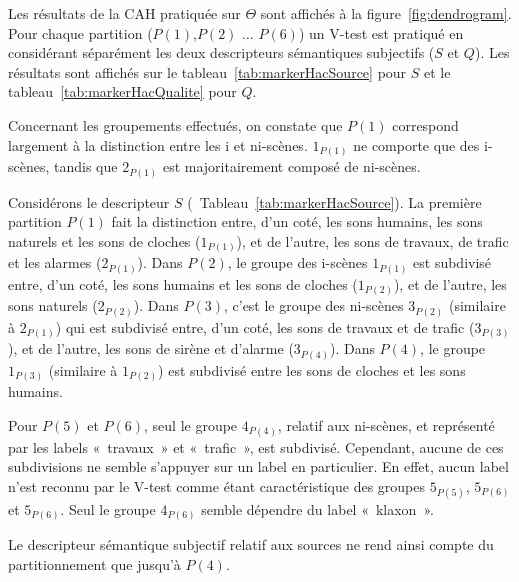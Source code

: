 Les résultats de la CAH pratiquée sur $\Theta$ sont affichés à la figure~\ref{fig:dendrogram}. Pour chaque partition ($P(1)$,$P(2)$ $\ldots$ $P(6)$) un V-test est pratiqué en considérant séparément les deux descripteurs sémantiques subjectifs ($S$ et $Q$). Les résultats sont affichés sur le tableau~\ref{tab:markerHacSource} pour $S$ et le tableau~\ref{tab:markerHacQualite} pour $Q$.

Concernant les groupements effectués, on constate que $P(1)$ correspond largement à la distinction entre les i et ni-scènes. $1_{P(1)}$ ne comporte que des i-scènes, tandis que $2_{P(1)}$ est majoritairement composé de ni-scènes.

Considérons le descripteur $S$ (\cf~Tableau~\ref{tab:markerHacSource}). La première partition $P(1)$ fait la distinction entre, d'un coté, les sons humains, les sons naturels et les sons de cloches ($1_{P(1)}$), et de l'autre, les sons de travaux, de trafic et les alarmes ($2_{P(1)}$). Dans $P(2)$, le groupe des i-scènes $1_{P(1)}$ est subdivisé entre, d'un coté, les sons humains et les sons de cloches ($1_{P(2)}$), et de l'autre, les sons naturels ($2_{P(2)}$). Dans $P(3)$, c'est le groupe des ni-scènes $3_{P(2)}$ (similaire à $2_{P(1)}$) qui est subdivisé entre, d'un coté, les sons de travaux et de trafic ($3_{P(3)}$), et de l'autre, les sons de sirène et d'alarme ($3_{P(4)}$). Dans $P(4)$, le groupe $1_{P(3)}$ (similaire à $1_{P(2)}$) est subdivisé entre les sons de cloches et les sons humains.

Pour $P(5)$ et $P(6)$, seul le groupe $4_{P(4)}$, relatif aux ni-scènes, et représenté par les labels «~travaux~» et «~trafic~», est subdivisé. Cependant, aucune de ces subdivisions ne semble s'appuyer sur un label en particulier. En effet, aucun label n'est reconnu par le V-test comme étant caractéristique des groupes $5_{P(5)}$, $5_{P(6)}$ et $5_{P(6)}$. Seul le groupe $4_{P(6)}$ semble dépendre du label «~klaxon~». 

Le descripteur sémantique subjectif relatif aux sources ne rend ainsi compte du partitionnement que jusqu'à $P(4)$.

